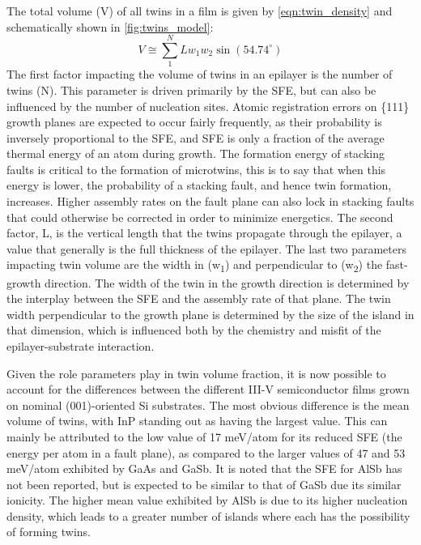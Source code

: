 The total volume (V) of all twins in a film is given by \cref{eqn:twin_density} and schematically shown in \cref{fig:twins_model}:
\begin{equation}\label{eqn:twin_density}
 V \cong \sum\limits_{1}^{N} L w_1 w_2 \sin(54.74^{\circ})
\end{equation}
The first factor impacting the volume of twins in an epilayer is the number of twins (N).
This parameter is driven primarily by the SFE, but can also be influenced by the number of nucleation sites.
Atomic registration errors on \{111\} growth planes are expected to occur fairly frequently, as their probability is inversely proportional to the SFE, and SFE is only a fraction of the average thermal energy of an atom during growth\cite{Ernst1989}.
The formation energy of stacking faults is critical to the formation of microtwins, this is to say that when this energy is lower, the probability of a stacking fault, and hence twin formation, increases\cite{Oda2007}.
Higher assembly rates on the fault plane can also lock in stacking faults that could otherwise be corrected in order to minimize energetics.
The second factor, L, is the vertical length that the twins propagate through the epilayer, a value that generally is the full thickness of the epilayer.
The last two parameters impacting twin volume are the width in (w\textsubscript{1}) and perpendicular to (w\textsubscript{2}) the fast-growth direction.
The width of the twin in the growth direction is determined by the interplay between the SFE and the assembly rate of that plane.
The twin width perpendicular to the growth plane is determined by the size of the island in that dimension, which is influenced both by the chemistry and misfit of the epilayer-substrate interaction.

Given the role parameters play in twin volume fraction, it is now possible to account for the differences between the different III-V semiconductor films grown on nominal (001)-oriented Si substrates.
The most obvious difference is the mean volume of twins, with InP standing out as having the largest value.
This can mainly be attributed to the low value of 17 meV/atom for its reduced SFE (the energy per atom in a fault plane)\cite{Gottschalk1978}, as compared to the larger values of 47 and 53 meV/atom exhibited by GaAs and GaSb\cite{Gottschalk1978}.
It is noted that the SFE for AlSb has not been reported, but is expected to be similar to that of GaSb due its similar ionicity\cite{Holt2007b}.
The higher mean value exhibited by AlSb is due to its higher nucleation density\cite{Akahane2004}, which leads to a greater number of islands where each has the possibility of forming twins.

